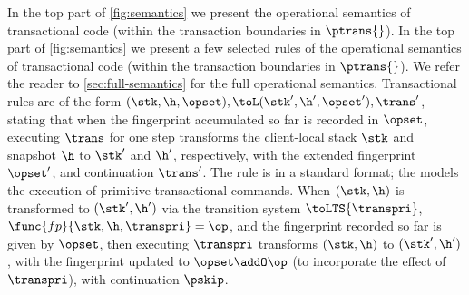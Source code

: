 \ifTechReport%
In the top part of \cref{fig:semantics} we present the operational semantics of transactional code (within the transaction boundaries in $\ptrans{}$). 
\else%
In the top part of \cref{fig:semantics} we present a few selected rules of the operational semantics of transactional code (within the transaction boundaries in $\ptrans{}$). 
We refer the reader to \cref{sec:full-semantics} for the full operational semantics.
\fi%
%
Transactional rules are of the form $(\stk, \h, \opset), \toL (\stk', \h', \opset'), \trans'$, 
stating that when the fingerprint accumulated so far is recorded in $\opset$, 
executing $\trans$ for one step transforms the client-local stack $\stk$ 
and snapshot $\h$ %
to $\stk'$ and $\h'$, respectively, with the extended fingerprint $\opset'$, and continuation $\trans'$.
The  rule is in a standard format; 
the   models the execution of primitive transactional commands.
When $(\stk, \h)$ is transformed to $(\stk', \h')$ via the transition system $\toLTS{\transpri}$,
$\func{fp}{\stk, \h, \transpri} = \op$, and the fingerprint recorded so far is given by $\opset$, 
then executing $\transpri$ transforms $(\stk, \h)$ to $(\stk', \h')$, with the fingerprint updated to $\opset \addO \op$ (to incorporate the effect of $\transpri$), with continuation $\pskip$. 







